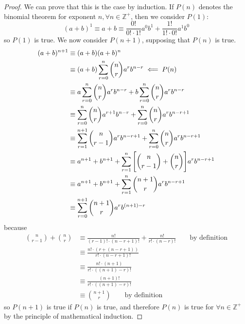\documentclass[fleqn,a4paper,11pt]{article}
\newcommand{\setstyle}{\mathbb}
\newcommand{\Integers}{\setstyle Z}
\begin{document}
    \begin{proof}
    We can prove that this is the case by induction. If \(P(n)\) denotes the
    binomial theorem for exponent \(n, \forall n \in \Integers^+\), then we
    consider \(P(1)\):
    \begin{equation*}
    (a + b)^1 \equiv a + b
        \equiv \frac{0!}{0!\cdot 1!} a^0b^1 + \frac{1!}{1!\cdot 0!} a^1b^0
    \end{equation*}
    so \(P(1)\) is true. We now consider \(P(n + 1)\), supposing that \(P(n)\)
    is true.
    \begin{align*}
    (a + b)^{n + 1} &\equiv (a + b)(a + b)^n \\
        &\equiv (a + b)\sum_{r = 0}^n \binom nr a^r b^{n - r}
            \impliedby P(n) \\
        &\equiv a\sum_{r = 0}^n \binom nr a^r b^{n - r}
              + b\sum_{r = 0}^n \binom nr a^r b^{n - r} \\
        &\equiv \sum_{r = 0}^n \binom nr a^{r + 1} b^{n - r}
              + \sum_{r = 0}^n \binom nr a^r b^{n - r + 1} \\
        &\equiv \sum_{r = 1}^{n + 1} \binom n{r - 1} a^{r} b^{n - r + 1}
              + \sum_{r = 0}^n \binom nr a^r b^{n - r + 1} \\
        &\equiv a^{n + 1} + b^{n + 1}
              + \sum_{r = 1}^n \bqty{\binom n{r - 1} + \binom nr}
                a^r b^{n - r + 1} \\
        &\equiv a^{n + 1} + b^{n + 1}
              + \sum_{r = 1}^n \binom{n + 1}r a^r b^{n - r + 1} \\
        &\equiv \sum_{r = 0}^{n + 1} \binom{n + 1}r a^r b^{(n + 1) - r} \\
    \end{align*}
    because
    \begin{align*}
    \binom n{r - 1} + \binom nr &\equiv \frac{n!}{(r - 1)! \cdot (n - r + 1)!}
                                     + \frac{n!}{r! \cdot (n - r)!}
                                        \qquad \text{by definition} \\
        &\equiv \frac{n!\cdot(r + (n - r + 1))}{r! \cdot (n - r + 1)!} \\
        &\equiv \frac{n! \cdot (n + 1)}{r! \cdot ((n + 1) - r)!} \\
        &\equiv \frac{(n + 1)!}{r! \cdot ((n + 1) - r)!} \\
        &\equiv \binom{n + 1} r \qquad \text{by definition}
    \end{align*}
    so \(P(n + 1)\) is true if \(P(n)\) is true, and therefore \(P(n)\) is true
    for \(\forall n \in \Integers^+\) by the principle of mathematical
    induction.
    \end{proof}
\end{document}
